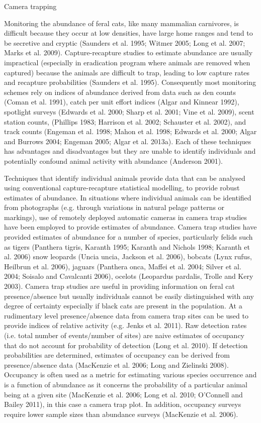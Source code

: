 \documentclass[version=last,
    paper=a4,                               %
    10pt,                                   %
    dvipsnames,
    oneside,                              %
    headings=openany,                       %
    open=any,
    BCOR=7mm,                               %
    DIV=15,     %
]{scrbook}
\begin{document}
Camera trapping

Monitoring the abundance of feral cats, like many mammalian carnivores,
is difficult because they occur at low densities, have large home ranges
and tend to be secretive and cryptic (Saunders et al. 1995; Witmer 2005;
Long et al. 2007; Marks et al. 2009). Capture-recapture studies to
estimate abundance are usually impractical (especially in eradication
program where animals are removed when captured) because the animals are
difficult to trap, leading to low capture rates and recapture
probabilities (Saunders et al. 1995). Consequently most monitoring
schemes rely on indices of abundance derived from data such as den
counts (Coman et al. 1991), catch per unit effort indices (Algar and
Kinnear 1992), spotlight surveys (Edwards et al. 2000; Sharp et al.
2001; Vine et al. 2009), scent station counts, (Phillips 1983; Harrison
et al. 2002; Schauster et al. 2002), and track counts (Engeman et al.
1998; Mahon et al. 1998; Edwards et al. 2000; Algar and Burrows 2004;
Engeman 2005; Algar et al. 2013a). Each of these techniques has
advantages and disadvantages but they are unable to identify individuals
and potentially confound animal activity with abundance (Anderson 2001).

Techniques that identify individual animals provide data that can be
analysed using conventional capture-recapture statistical modelling, to
provide robust estimates of abundance. In situations where individual
animals can be identified from photographs (e.g. through variations in
natural pelage patterns or markings), use of remotely deployed automatic
cameras in camera trap studies have been employed to provide estimates
of abundance. Camera trap studies have provided estimates of abundance
for a number of species, particularly felids such as tigers (Panthera
tigris, Karanth 1995; Karanth and Nichols 1998; Karanth et al. 2006)
snow leopards (Uncia uncia, Jackson et al. 2006), bobcats (Lynx rufus,
Heilbrun et al. 2006), jaguars (Panthera onca, Maffei et al. 2004;
Silver et al. 2004; Soisalo and Cavalcanti 2006), ocelots (Leopardus
pardalis, Trolle and Kery 2003). Camera trap studies are useful in
providing information on feral cat presence/absence but usually
individuals cannot be easily distinguished with any degree of certainty
especially if black cats are present in the population. At a rudimentary
level presence/absence data from camera trap sites can be used to
provide indices of relative activity (e.g. Jenks et al. 2011). Raw
detection rates (i.e. total number of events/number of sites) are naive
estimates of occupancy that do not account for probability of detection
(Long et al. 2010). If detection probabilities are determined, estimates
of occupancy can be derived from presence/absence data (MacKenzie et al.
2006; Long and Zielinski 2008). Occupancy is often used as a metric for
estimating various species occurrence and is a function of abundance as
it concerns the probability of a particular animal being at a given site
(MacKenzie et al. 2006; Long et al. 2010; O'Connell and Bailey 2011), in
this case a camera trap plot. In addition, occupancy surveys require
lower sample sizes than abundance surveys (MacKenzie et al. 2006).
\end{document}

